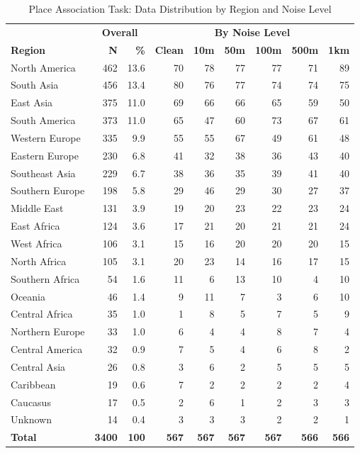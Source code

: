 \begin{table}[htbp]
\centering
\caption{Place Association Task: Data Distribution by Region and Noise Level}
\label{tab:place_association_combined}
\small
\begin{tabular}{l|rr|rrrrrr}
\toprule
 & \multicolumn{2}{c|}{\textbf{Overall}} & \multicolumn{6}{c}{\textbf{By Noise Level}} \\
\textbf{Region} & \textbf{N} & \textbf{\%} & \textbf{Clean} & \textbf{10m} & \textbf{50m} & \textbf{100m} & \textbf{500m} & \textbf{1km} \\
\midrule
North America & 462 & 13.6 & 70 & 78 & 77 & 77 & 71 & 89 \\
South Asia & 456 & 13.4 & 80 & 76 & 77 & 74 & 74 & 75 \\
East Asia & 375 & 11.0 & 69 & 66 & 66 & 65 & 59 & 50 \\
South America & 373 & 11.0 & 65 & 47 & 60 & 73 & 67 & 61 \\
Western Europe & 335 & 9.9 & 55 & 55 & 67 & 49 & 61 & 48 \\
Eastern Europe & 230 & 6.8 & 41 & 32 & 38 & 36 & 43 & 40 \\
Southeast Asia & 229 & 6.7 & 38 & 36 & 35 & 39 & 41 & 40 \\
Southern Europe & 198 & 5.8 & 29 & 46 & 29 & 30 & 27 & 37 \\
Middle East & 131 & 3.9 & 19 & 20 & 23 & 22 & 23 & 24 \\
East Africa & 124 & 3.6 & 17 & 21 & 20 & 21 & 21 & 24 \\
West Africa & 106 & 3.1 & 15 & 16 & 20 & 20 & 20 & 15 \\
North Africa & 105 & 3.1 & 20 & 23 & 14 & 16 & 17 & 15 \\
Southern Africa & 54 & 1.6 & 11 & 6 & 13 & 10 & 4 & 10 \\
Oceania & 46 & 1.4 & 9 & 11 & 7 & 3 & 6 & 10 \\
Central Africa & 35 & 1.0 & 1 & 8 & 5 & 7 & 5 & 9 \\
Northern Europe & 33 & 1.0 & 6 & 4 & 4 & 8 & 7 & 4 \\
Central America & 32 & 0.9 & 7 & 5 & 4 & 6 & 8 & 2 \\
Central Asia & 26 & 0.8 & 3 & 6 & 2 & 5 & 5 & 5 \\
Caribbean & 19 & 0.6 & 7 & 2 & 2 & 2 & 2 & 4 \\
Caucasus & 17 & 0.5 & 2 & 6 & 1 & 2 & 3 & 3 \\
Unknown & 14 & 0.4 & 3 & 3 & 3 & 2 & 2 & 1 \\
\midrule
\textbf{Total} & \textbf{3400} & \textbf{100} & \textbf{567} & \textbf{567} & \textbf{567} & \textbf{567} & \textbf{566} & \textbf{566} \\
\bottomrule
\end{tabular}
\end{table}

